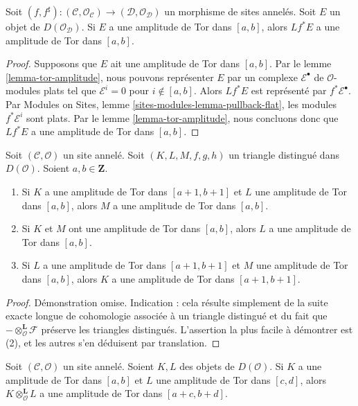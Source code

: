 \begin{lemma}
\label{lemma-tor-amplitude-pullback}
Soit $(f, f^\sharp) : (\mathcal{C}, \mathcal{O}_\mathcal{C}) \to
(\mathcal{D}, \mathcal{O}_\mathcal{D})$
un morphisme de sites annelés. Soit $E$ un objet de
$D(\mathcal{O}_\mathcal{D})$. Si $E$ a une amplitude de Tor dans $[a, b]$,
alors $Lf^*E$ a une amplitude de Tor dans $[a, b]$.
\end{lemma}

\begin{proof}
Supposons que $E$ ait une amplitude de Tor dans $[a, b]$. Par le lemme
\ref{lemma-tor-amplitude}, nous pouvons représenter $E$ par un complexe
$\mathcal{E}^\bullet$ de $\mathcal{O}$-modules plats tel que
$\mathcal{E}^i = 0$ pour $i \not \in [a, b]$. Alors $Lf^*E$ est représenté
par $f^*\mathcal{E}^\bullet$. Par Modules on Sites, lemme
\ref{sites-modules-lemma-pullback-flat}, les modules
$f^*\mathcal{E}^i$ sont plats. Par le lemme \ref{lemma-tor-amplitude}, nous
concluons donc que $Lf^*E$ a une amplitude de Tor dans $[a, b]$.
\end{proof}

\begin{lemma}
\label{lemma-cone-tor-amplitude}
Soit $(\mathcal{C}, \mathcal{O})$ un site annelé. Soit
$(K, L, M, f, g, h)$ un triangle distingué dans $D(\mathcal{O})$.
Soient $a, b \in \mathbf{Z}$.
\begin{enumerate}
\item Si $K$ a une amplitude de Tor dans $[a + 1, b + 1]$ et $L$ une
amplitude de Tor dans $[a, b]$, alors $M$ a une amplitude de Tor dans
$[a, b]$.
\item Si $K$ et $M$ ont une amplitude de Tor dans $[a, b]$, alors $L$ a une
amplitude de Tor dans $[a, b]$.
\item Si $L$ a une amplitude de Tor dans $[a + 1, b + 1]$ et $M$ une
amplitude de Tor dans $[a, b]$, alors $K$ a une amplitude de Tor dans
$[a + 1, b + 1]$.
\end{enumerate}
\end{lemma}

\begin{proof}
Démonstration omise. Indication : cela résulte simplement de la suite exacte
longue de cohomologie associée à un triangle distingué et du fait que
$- \otimes_\mathcal{O}^{\mathbf{L}} \mathcal{F}$
préserve les triangles distingués. L'assertion la plus facile à démontrer est
(2), et les autres s'en déduisent par translation.
\end{proof}

\begin{lemma}
\label{lemma-tensor-tor-amplitude}
Soit $(\mathcal{C}, \mathcal{O})$ un site annelé. Soient $K, L$ des objets
de $D(\mathcal{O})$. Si $K$ a une amplitude de Tor dans $[a, b]$ et $L$ une
amplitude de Tor dans $[c, d]$, alors $K \otimes_\mathcal{O}^\mathbf{L} L$
a une amplitude de Tor dans $[a + c, b + d]$.
\end{lemma}

